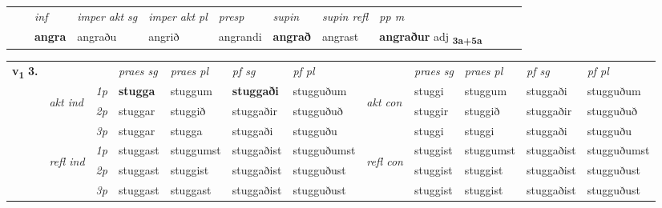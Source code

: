 \begin{tabular}{llllllllllll}
 & & \textit{inf} & \textit{imper akt sg} & \textit{imper akt pl}   & \textit{presp} & \textit{supin} & \textit{supin refl} & \textit{pp m}     \\*
  & & \textbf{angra} & angraðu  & angrið   & angrandi &  \textbf{angrað} & angrast & \textbf{angraður} adj \textbf{\textsubscript{3a+5a}} \\*
\cmidrule{1-12}
\end{tabular}



\begin{tabular}{llllllllllll} \toprule
\multirow{4}{*}{{{\textbf{v{\textsubscript{1}}} \Large{\textbf{3.}}}}}  & &   &  \textit{praes sg}  & \textit{praes pl}  &\textit{ pf sg} & \textit{pf pl} &  &  \textit{praes sg}  & \textit{praes pl}  & \textit{pf sg} & \textit{pf pl } \\*
	\cmidrule{4-7} \cmidrule{9-12}
 & \multirow{3}{*}{\begin{turn}{90}\textit{akt ind}\end{turn}} & {\textit{1p}} & \textbf{stugga} & stuggum    & \textbf{stuggaði} & stugguðum & \multirow{3}{*}{\begin{turn}{90}\textit{akt con}\end{turn}} &stuggi & stuggum & stuggaði & stugguðum\\*
& &  {\textit{2p}} &  stuggar  & stuggið   & stuggaðir & stugguðuð & & stuggir & stuggið & stuggaðir & stugguðuð \\*
& &  {\textit{3p}} & stuggar & stugga   & stuggaði & stugguðu & & stuggi & stuggi& stuggaði & stugguðu  \\*
\cmidrule{4-7} \cmidrule{9-12}
 &\multirow{3}{*}{\begin{turn}{90}\textit{refl ind}\end{turn}} & {\textit{1p}} & stuggast & stuggumst    & stuggaðist & stugguðumst & \multirow{3}{*}{\begin{turn}{90}\textit{refl con}\end{turn}}  &stuggist & stuggumst & stuggaðist & stugguðumst\\*
 &&  {\textit{2p}} &  stuggast  & stuggist   & stuggaðist & stugguðust & &stuggist & stuggist & stuggaðist & stugguðust \\*
& &  {\textit{3p}} & stuggast & stuggast   & stuggaðist & stugguðust & & stuggist & stuggist& stuggaðist & stugguðust  \\*
\cmidrule{4-7} \cmidrule{9-12}
\end{tabular}



